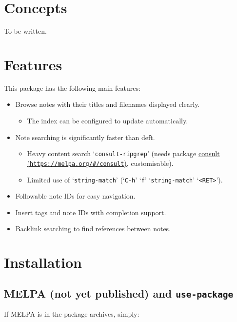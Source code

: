 \documentclass{book}
\renewcommand{\_}{\Texinfounderscore\discretionary{}{}{}}
\begin{document}
\chapter{{Concepts}}
\label{anchor:Concepts}%

To be written.

\chapter{{Features}}
\label{anchor:Features}%

This package has the following main features:
\begin{itemize}
\item Browse notes with their titles and filenames displayed clearly.
\begin{itemize}
\item The index can be configured to update automatically.
\end{itemize}
\item Note searching is significantly faster than deft.
\begin{itemize}
\item Heavy content search `\texttt{consult-ripgrep}' (needs package \href{https://melpa.org/\#/consult}{consult (\nolinkurl{https://melpa.org/\#/consult})},
customisable).
\item Limited use of `\texttt{string-match}' (`\texttt{C-h}' `\texttt{f}' `\texttt{string-match}' `\texttt{<RET>}').
\end{itemize}
\item Followable note IDs for easy navigation.
\item Insert tags and note IDs with completion support.
\item Backlink searching to find references between notes.
\end{itemize}

\chapter{{Installation}}
\label{anchor:Installation}%


\section{{MELPA (not yet published) and \texttt{use-package}}}
\label{anchor:MELPA-_0028not-yet-published_0029-and-use_002dpackage}%

If MELPA is in the package archives, simply:
\end{document}
